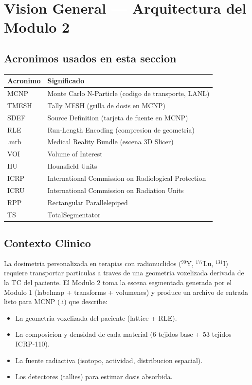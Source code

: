 \documentclass[12pt,a4paper]{article}
\begin{document}
\section{Vision General --- Arquitectura del Modulo 2}
\label{sec:vision}

\subsection*{Acronimos usados en esta seccion}
\begin{tabular}{ll}
\toprule
\textbf{Acronimo} & \textbf{Significado} \\
\midrule
MCNP & Monte Carlo N-Particle (codigo de transporte, LANL) \\
TMESH & Tally MESH (grilla de dosis en MCNP) \\
SDEF & Source Definition (tarjeta de fuente en MCNP) \\
RLE & Run-Length Encoding (compresion de geometria) \\
.mrb & Medical Reality Bundle (escena 3D Slicer) \\
VOI & Volume of Interest \\
HU & Hounsfield Units \\
ICRP & International Commission on Radiological Protection \\
ICRU & International Commission on Radiation Units \\
RPP & Rectangular Parallelepiped \\
TS & TotalSegmentator \\
\bottomrule
\end{tabular}

\subsection{Contexto Clinico}

La dosimetria personalizada en terapias con radionuclidos ($^{90}$Y, $^{177}$Lu, $^{131}$I) requiere transportar particulas a traves de una geometria voxelizada derivada de la TC del paciente. El Modulo 2 toma la escena segmentada generada por el Modulo 1 (labelmap + transforms + volumenes) y produce un archivo de entrada listo para MCNP (.i) que describe:

\begin{itemize}
    \item La geometria voxelizada del paciente (lattice + RLE).
    \item La composicion y densidad de cada material (6 tejidos base + 53 tejidos ICRP-110).
    \item La fuente radiactiva (isotopo, actividad, distribucion espacial).
    \item Los detectores (tallies) para estimar dosis absorbida.
\end{itemize}
\end{document}
